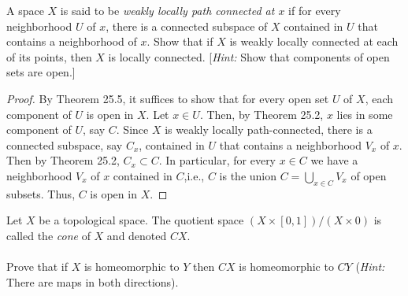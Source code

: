 \newpage
\begin{problem}[Munkres \S25, Ex.\,6]
A space $X$ is said to be \emph{weakly locally path connected at
  $x$} if for every neighborhood $U$ of $x$, there is a connected
subspace of $X$ contained in $U$ that contains a neighborhood of
$x$. Show that if $X$ is weakly locally connected at each of its
points, then $X$ is locally connected. [\emph{Hint:} Show that
components of open sets are open.]
\end{problem}
\begin{proof}
By Theorem 25.5, it suffices to show that for every open set $U$
of $X$, each component of $U$ is open in $X$. Let $x\in U$. Then,
by Theorem 25.2, $x$ lies in some component of $U$, say
$C$. Since $X$ is weakly locally path-connected, there is a
connected subspace, say $C_x$, contained in $U$ that contains a
neighborhood $V_x$ of $x$. Then by Theorem 25.2, $C_x\subset
C$. In particular, for every $x\in C$ we have a neighborhood
$V_x$ of $x$ contained in $C$,i.e., $C$ is the union
$C=\bigcup_{x\in C}V_x$ of open subsets. Thus, $C$ is open in $X$.
\end{proof}
\newpage
\begin{problem}[A]
Let $X$ be a topological space. The quotient space
$(X\times[0,1])/(X\times 0)$ is called the \emph{cone} of $X$ and
denoted $CX$.
\\\\
Prove that if $X$ is homeomorphic to $Y$ then $CX$ is
homeomorphic to $CY$ (\emph{Hint:} There are maps in both
directions).
\end{problem}
